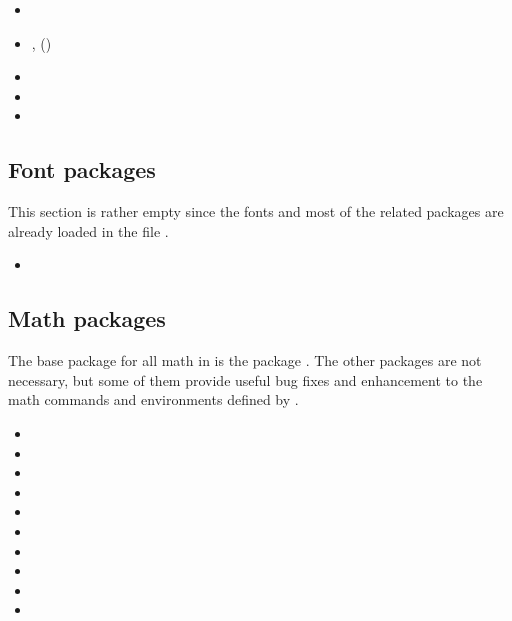 \begin{itemize}[noitemsep]
\item {}
\item {}, ()
\item {}
\item {}
\item {}
\end{itemize}



\subsection{Font packages}
This section is rather empty since the fonts and most of the related packages are already loaded in the file .

\begin{itemize}[noitemsep]
\item {}
\end{itemize}


\subsection{Math packages}
The base package for all math in \latex is the package . The other packages are not necessary, but some of them provide useful bug fixes and enhancement to the math commands and environments defined by .

\begin{itemize}[noitemsep]
\item {}
\item {}
\item {}
\item {}
\item {}
\item {}
\item {}
\item {}
\item {}
\item {}
\end{itemize}

